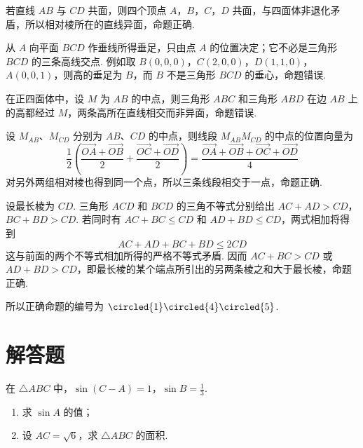 \begin{solution}
{} 若直线 \(AB\) 与 \(CD\) 共面，则四个顶点 \(A\)，\(B\)，\(C\)，\(D\) 共面，与四面体非退化矛盾，所以相对棱所在的直线异面，命题{}正确.

{} 从 \(A\) 向平面 \(BCD\) 作垂线所得垂足，只由点 \(A\) 的位置决定；它不必是三角形 \(BCD\) 的三条高线交点. 例如取 \(B(0,0,0)\)，\(C(2,0,0)\)，\(D(1,1,0)\)，\(A(0,0,1)\)，则高的垂足为 \(B\)，而 \(B\) 不是三角形 \(BCD\) 的垂心，命题{}错误.

{} 在正四面体中，设 \(M\) 为 \(AB\) 的中点，则三角形 \(ABC\) 和三角形 \(ABD\) 在边 \(AB\) 上的高都经过 \(M\)，两条高所在直线相交而非异面，命题{}错误.

{} 设 \(M_{AB}\)、\(M_{CD}\) 分别为 \(AB\)、\(CD\) 的中点，则线段 \(M_{AB}M_{CD}\) 的中点的位置向量为
\[
\frac{1}{2}\left(\frac{\overrightarrow{OA}+\overrightarrow{OB}}{2}+\frac{\overrightarrow{OC}+\overrightarrow{OD}}{2}\right)=\frac{\overrightarrow{OA}+\overrightarrow{OB}+\overrightarrow{OC}+\overrightarrow{OD}}{4}
\]
对另外两组相对棱也得到同一个点，所以三条线段相交于一点，命题{}正确.

{} 设最长棱为 \(CD\). 三角形 \(ACD\) 和 \(BCD\) 的三角不等式分别给出
\(AC+AD>CD\)，\(BC+BD>CD\).
若同时有 \(AC+BC\leqslant CD\) 和 \(AD+BD\leqslant CD\)，两式相加将得到
\[
AC+AD+BC+BD\leqslant2CD
\]
这与前面的两个不等式相加所得的严格不等式矛盾. 因而 \(AC+BC>CD\) 或 \(AD+BD>CD\)，即最长棱的某个端点所引出的另两条棱之和大于最长棱，命题{}正确.

所以正确命题的编号为 \(\circled{1}\circled{4}\circled{5}\).
\end{solution}

\section{解答题}

\begin{problem}
在 \(\triangle ABC\) 中，\(\sin (C - A) = 1\)，\(\sin B = \frac{1}{3}\).

\begin{enumerate}
\item 求 \(\sin A\) 的值；
\item 设 \(AC = \sqrt{6}\)，求 \(\triangle ABC\) 的面积.
\end{enumerate}
\end{problem}

